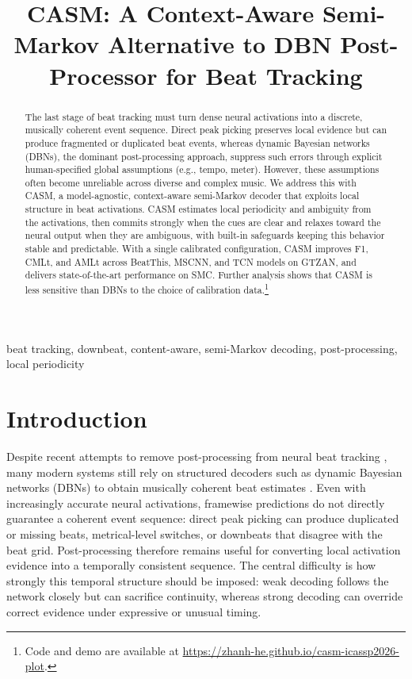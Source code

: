 \documentclass{article}
\title{CASM: A Context-Aware Semi-Markov Alternative to DBN Post-Processor for Beat Tracking}
\begin{document}
\ninept
\maketitle

\begin{abstract}
The last stage of beat tracking must turn dense neural activations into a discrete, musically coherent event sequence. Direct peak picking preserves local evidence but can produce fragmented or duplicated beat events, whereas dynamic Bayesian networks (DBNs), the dominant post-processing approach, suppress such errors through explicit human-specified global assumptions (e.g., tempo, meter). However, these assumptions often become unreliable across diverse and complex music. We address this with CASM, a model-agnostic, context-aware semi-Markov decoder that exploits local structure in beat activations. CASM estimates local periodicity and ambiguity from the activations, then commits strongly when the cues are clear and relaxes toward the neural output when they are ambiguous, with built-in safeguards keeping this behavior stable and predictable. With a single calibrated configuration, CASM improves F1, CMLt, and AMLt across BeatThis, MSCNN, and TCN models on GTZAN, and delivers state-of-the-art performance on SMC. Further analysis shows that CASM is less sensitive than DBNs to the choice of calibration data.\footnote{Code and demo are available at \url{https://zhanh-he.github.io/casm-icassp2026-plot}.}
\end{abstract}

\begin{keywords}
beat tracking, downbeat, content-aware, semi-Markov decoding, post-processing, local periodicity
\end{keywords}


\section{Introduction}
\label{sec:intro}
Despite recent attempts to remove post-processing from neural beat tracking \cite{chen2022postprocessingfree,foscarin2024beat}, many modern systems still rely on structured decoders such as dynamic Bayesian networks (DBNs) to obtain musically coherent beat estimates \cite{krebs2015dbn}. Even with increasingly accurate neural activations, framewise predictions do not directly guarantee a coherent event sequence: direct peak picking can produce duplicated or missing beats, metrical-level switches, or downbeats that disagree with the beat grid. Post-processing therefore remains useful for converting local activation evidence into a temporally consistent sequence. The central difficulty is how strongly this temporal structure should be imposed: weak decoding follows the network closely but can sacrifice continuity, whereas strong decoding can override correct evidence under expressive or unusual timing.
\end{document}
